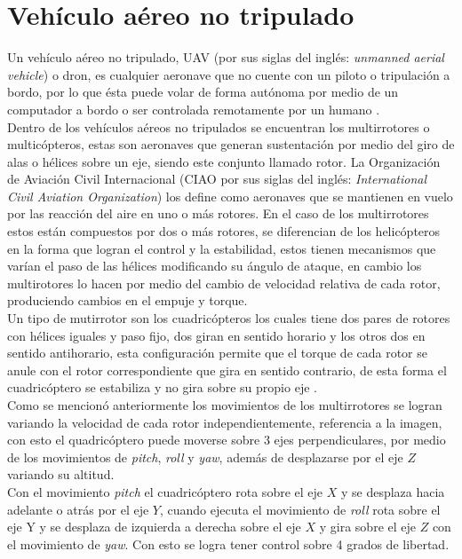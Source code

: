 \documentclass{iccmemoria}
\begin{document}
\section{Vehículo aéreo no tripulado}

Un vehículo aéreo no tripulado, UAV (por sus siglas del inglés: \emph{unmanned aerial vehicle}) o dron, es cualquier aeronave que no cuente con un piloto o tripulación a bordo, por lo que ésta puede volar de forma autónoma por medio de un computador a bordo o ser controlada remotamente por un humano \cite{icao2011UAS}.\\

Dentro de los vehículos aéreos no tripulados se encuentran los multirrotores o multicópteros, estas son aeronaves que generan sustentación por medio del giro de alas o hélices sobre un eje, siendo este conjunto llamado rotor. La Organización de Aviación Civil Internacional (CIAO por sus siglas del inglés: \emph{International Civil Aviation Organization}) los define como aeronaves que se mantienen en vuelo por las reacción del aire en uno o más rotores. En el caso de los multirrotores estos están compuestos por dos o más rotores, se diferencian de los helicópteros en la forma que logran el control y la estabilidad, estos tienen mecanismos que varían el paso de las hélices modificando su ángulo de ataque, en cambio los multirotores lo hacen por medio del cambio de velocidad relativa de cada rotor, produciendo cambios en el empuje y torque.\\

Un tipo de mutirrotor son los cuadricópteros los cuales tiene dos pares de rotores con hélices iguales y paso fijo, dos giran en sentido horario y los otros dos en sentido antihorario, esta configuración permite que el torque de cada rotor se anule con el rotor correspondiente que gira en sentido contrario, de esta forma el cuadricóptero se estabiliza y no gira sobre su propio eje \cite{AllenQuadcopters}.\\

Como se mencionó anteriormente los movimientos de los multirrotores se logran variando la velocidad de cada rotor independientemente, referencia a la imagen, con esto el quadricóptero puede moverse sobre 3 ejes perpendiculares, por medio de los movimientos de \emph{pitch}, \emph{roll} y \emph{yaw}, además de desplazarse por el eje $Z$ variando su altitud.\\

Con el movimiento \emph{pitch} el cuadricóptero rota sobre el eje $X$ y se desplaza hacia adelante o atrás por el eje $Y$, cuando ejecuta el movimiento de \emph{roll} rota sobre el eje Y y se desplaza de izquierda a derecha sobre el eje $X$ y gira sobre el eje $Z$ con el movimiento de \emph{yaw}. Con esto se logra tener control sobre 4 grados de libertad.\\
\end{document}
